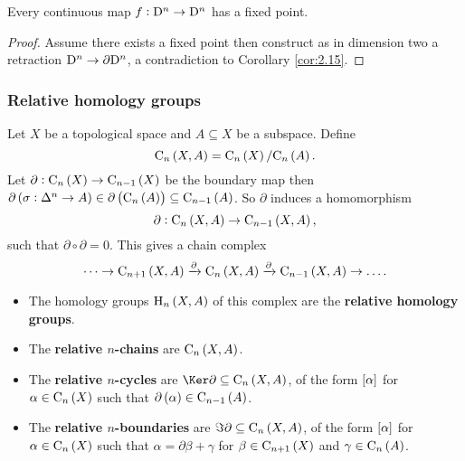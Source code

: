\begin{theorem}
Every continuous map $ f : \mathrm{D}^n \to \mathrm{D}^n $ has a fixed point.
\end{theorem}

\begin{proof}
Assume there exists a fixed point then construct as in dimension two a retraction $ \mathrm{D}^n \to \partial \mathrm{D}^n $, a contradiction to Corollary \ref{cor:2.15}.
\end{proof}

\subsubsection{Relative homology groups}

Let $ X $ be a topological space and $ A \subseteq X $ be a subspace. Define
$$ \C_n\br{X, A} = \C_n\br{X} / \C_n\br{A}. $$
Let $ \partial : \C_n\br{X} \to \C_{n - 1}\br{X} $ be the boundary map then $ \partial\br{\sigma : \Delta^n \to A} \in \partial\br{\C_n\br{A}} \subseteq \C_{n - 1}\br{A} $. So $ \partial $ induces a homomorphism
$$ \partial : \C_n\br{X, A} \to \C_{n - 1}\br{X, A}, $$
such that $ \partial \circ \partial = 0 $. This gives a chain complex
$$ \dots \to \C_{n + 1}\br{X, A} \xrightarrow{\partial} \C_n\br{X, A} \xrightarrow{\partial} \C_{n - 1}\br{X, A} \to \dots. $$
\begin{itemize}
\item The homology groups $ \H_n\br{X, A} $ of this complex are the \textbf{relative homology groups}.
\item The \textbf{relative $ n $-chains} are $ \C_n\br{X, A} $.
\item The \textbf{relative $ n $-cycles} are $ \Ker \partial \subseteq \C_n\br{X, A} $, of the form $ \sbr{\alpha} $ for $ \alpha \in \C_n\br{X} $ such that $ \partial\br{\alpha} \in \C_{n - 1}\br{A} $.
\item The \textbf{relative $ n $-boundaries} are $ \Im \partial \subseteq \C_n\br{X, A} $, of the form $ \sbr{\alpha} $ for $ \alpha \in \C_n\br{X} $ such that $ \alpha = \partial\beta + \gamma $ for $ \beta \in \C_{n + 1}\br{X} $ and $ \gamma \in \C_n\br{A} $.
\end{itemize}

\pagebreak


